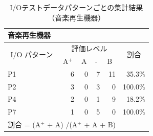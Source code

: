 \begin{table}[htbp]
  \centering
  \caption{I/Oテストデータパターンごとの集計結果（音楽再生機器）}
    \begin{tabular}{lllllr}
    音楽再生機器 &       &       &       &       &  \bigstrut[b]\\
    \hline
    \multicolumn{1}{|c|}{\multirow{2}[4]{*}{I/O パターン}} & \multicolumn{4}{c|}{評価レベル}    & \multicolumn{1}{c|}{\multirow{2}[4]{*}{割合}} \bigstrut\\
\cline{2-5}    \multicolumn{1}{|c|}{} & \multicolumn{1}{l|}{A${}^\text{+}$} & \multicolumn{1}{l|}{A} & \multicolumn{1}{l|}{-} & \multicolumn{1}{l|}{B} & \multicolumn{1}{c|}{} \bigstrut\\
    \hline
    \hline
    \multicolumn{1}{|l|}{P1} & \multicolumn{1}{r|}{6} & \multicolumn{1}{r|}{0} & \multicolumn{1}{r|}{7} & \multicolumn{1}{r|}{11} & \multicolumn{1}{r|}{35.3\%} \bigstrut\\
    \hline
    \multicolumn{1}{|l|}{P2} & \multicolumn{1}{r|}{3} & \multicolumn{1}{r|}{0} & \multicolumn{1}{r|}{3} & \multicolumn{1}{r|}{0} & \multicolumn{1}{r|}{100.0\%} \bigstrut\\
    \hline
    \multicolumn{1}{|l|}{P4} & \multicolumn{1}{r|}{2} & \multicolumn{1}{r|}{0} & \multicolumn{1}{r|}{1} & \multicolumn{1}{r|}{9} & \multicolumn{1}{r|}{18.2\%} \bigstrut\\
    \hline
    \multicolumn{1}{|l|}{P7} & \multicolumn{1}{r|}{1} & \multicolumn{1}{r|}{0} & \multicolumn{1}{r|}{5} & \multicolumn{1}{r|}{0} & \multicolumn{1}{r|}{100.0\%} \bigstrut\\
    \hline
    \multicolumn{5}{l}{割合 = (A${}^\text{+}$  +  A) /(A${}^\text{+}$  +  A + B) } &  \bigstrut[t]\\
    \end{tabular}%
\label{tab:D-4-tab9}%
\end{table}%

